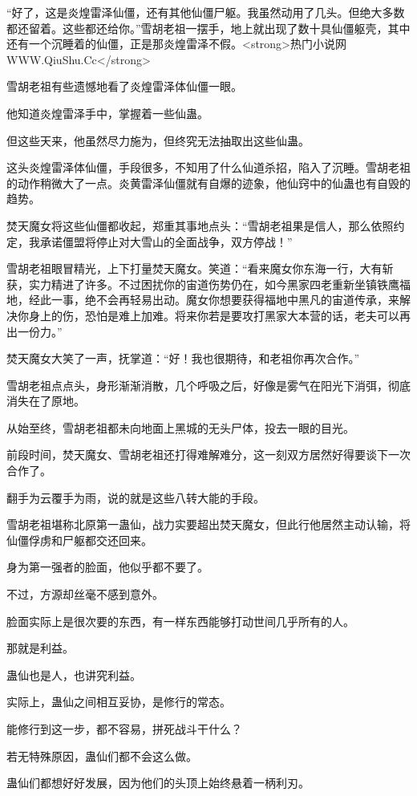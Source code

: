 \begin{this_body}
“好了，这是炎煌雷泽仙僵，还有其他仙僵尸躯。我虽然动用了几头。但绝大多数都还留着。这些都还给你。”雪胡老祖一摆手，地上就出现了数十具仙僵躯壳，其中还有一个沉睡着的仙僵，正是那炎煌雷泽不假。<strong>热门小说网WWW.QiuShu.Cc</strong>

雪胡老祖有些遗憾地看了炎煌雷泽体仙僵一眼。

他知道炎煌雷泽手中，掌握着一些仙蛊。

但这些天来，他虽然尽力施为，但终究无法抽取出这些仙蛊。

这头炎煌雷泽体仙僵，手段很多，不知用了什么仙道杀招，陷入了沉睡。雪胡老祖的动作稍微大了一点。炎黄雷泽仙僵就有自爆的迹象，他仙窍中的仙蛊也有自毁的趋势。

焚天魔女将这些仙僵都收起，郑重其事地点头：“雪胡老祖果是信人，那么依照约定，我承诺僵盟将停止对大雪山的全面战争，双方停战！”

雪胡老祖眼冒精光，上下打量焚天魔女。笑道：“看来魔女你东海一行，大有斩获，实力精进了许多。不过困扰你的宙道伤势仍在，如今黑家四老重新坐镇铁鹰福地，经此一事，绝不会再轻易出动。魔女你想要获得福地中黑凡的宙道传承，来解决你身上的伤，恐怕是难上加难。将来你若是要攻打黑家大本营的话，老夫可以再出一份力。”

焚天魔女大笑了一声，抚掌道：“好！我也很期待，和老祖你再次合作。”

雪胡老祖点点头，身形渐渐消散，几个呼吸之后，好像是雾气在阳光下消弭，彻底消失在了原地。

从始至终，雪胡老祖都未向地面上黑城的无头尸体，投去一眼的目光。

前段时间，焚天魔女、雪胡老祖还打得难解难分，这一刻双方居然好得要谈下一次合作了。

翻手为云覆手为雨，说的就是这些八转大能的手段。

雪胡老祖堪称北原第一蛊仙，战力实要超出焚天魔女，但此行他居然主动认输，将仙僵俘虏和尸躯都交还回来。

身为第一强者的脸面，他似乎都不要了。

不过，方源却丝毫不感到意外。

脸面实际上是很次要的东西，有一样东西能够打动世间几乎所有的人。

那就是利益。

蛊仙也是人，也讲究利益。

实际上，蛊仙之间相互妥协，是修行的常态。

能修行到这一步，都不容易，拼死战斗干什么？

若无特殊原因，蛊仙们都不会这么做。

蛊仙们都想好好发展，因为他们的头顶上始终悬着一柄利刃。


\end{this_body}
